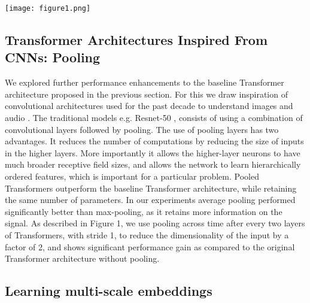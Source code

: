 \documentclass{article}
\begin{document}
\begin{sloppy}
\begin{figure*}[tb]
\centering
\texttt{[image: figure1.png]}
\end{figure*}



\subsection{Transformer Architectures Inspired From CNNs: Pooling} We explored further performance enhancements to the baseline Transformer architecture proposed in the previous section. For this we draw inspiration of convolutional architectures used for the past decade to understand images \cite{deng2009imagenet} and audio \cite{gemmeke2017audio}. The traditional models e.g. Resnet-50 \cite{he2016deep}, consists of using a combination of convolutional layers followed by pooling. The use of pooling layers has two advantages. It reduces the number of computations by reducing the size of inputs in the higher layers. More importantly it allows the higher-layer neurons to have much broader receptive field sizes, and allows the network to learn hierarchically ordered features, which is important for a particular problem. Pooled Transformers outperform the baseline Transformer architecture, while retaining the same number of parameters. In our experiments average pooling performed significantly better than max-pooling, as it retains more information on the signal. As described in Figure 1, we use pooling across time after every two layers of Transformers, with stride 1, to reduce the dimensionality of the input by a factor of 2, and shows significant performance gain as compared to the original Transformer architecture without pooling. 

\subsection{Learning multi-scale embeddings}


\end{sloppy}
\end{document}
